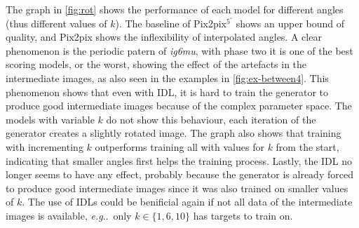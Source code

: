 \documentclass[runningheads]{llncs}
\makeatletter
\DeclareRobustCommand\onedot{\futurelet\@let@token\@onedot}
\def\@onedot{\ifx\@let@token.\else.\null\fi\xspace}
\def\eg{\emph{e.g}\onedot} \def\Eg{\emph{E.g}\onedot}
\let\wip\emph
\makeatother
\begin{document}
The graph in \autoref{fig:rot} shows the performance of each model for different angles (thus different values of $k$).
The baseline of Pix2pix$^{5^\circ}$ shows an upper bound of quality, and Pix2pix shows the inflexibility of interpolated angles.
A clear phenomenon is the periodic patern of \wip{ig6mu}, with phase two it is one of the best scoring models, or the worst, showing the effect of the artefacts in the intermediate images, as also seen in the examples in \autoref{fig:ex-between4}.
This phenomenon shows that even with IDL, it is hard to train the generator to produce good intermediate images because of the complex parameter space.
The models with variable $k$ do not show this behaviour, each iteration of the generator creates a slightly rotated image.
The graph also shows that training with incrementing $k$ outperforms training all with values for $k$ from the start, indicating that smaller angles first helps the training process.
Lastly, the IDL no longer seems to have any effect, probably because the generator is already forced to produce good intermediate images since it was also trained on smaller values of $k$.
The use of IDLs could be benificial again if not all data of the intermediate images is available, \eg~only $k\in\{1,6,10\}$ has targets to train on.
\end{document}
